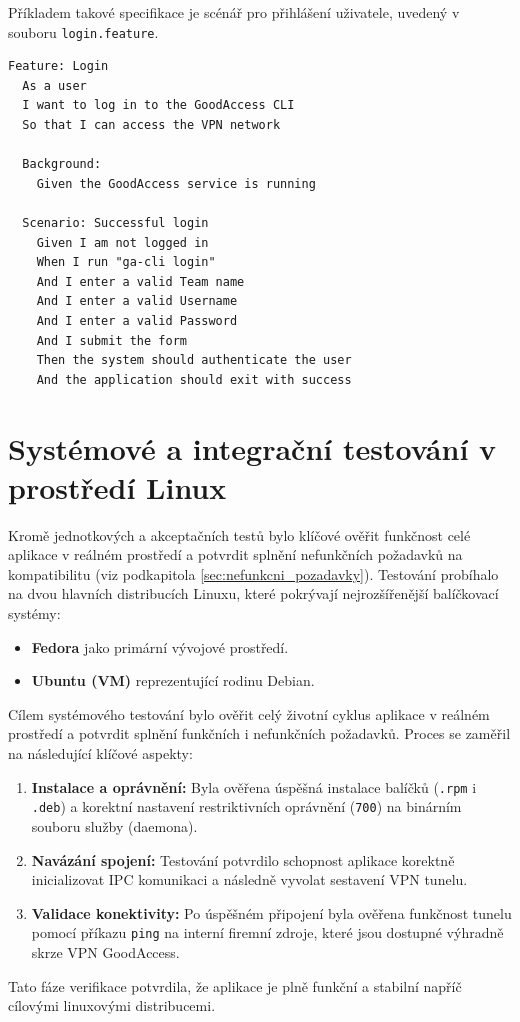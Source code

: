 Příkladem takové specifikace je scénář pro přihlášení uživatele, uvedený v souboru \texttt{login.feature}.

\begin{lstlisting}[language=Gherkin, stringstyle=\itshape, caption={Ukázka akceptačního testu pro přihlášení v jazyce Gherkin}, label={lst:login_feature}]
Feature: Login
  As a user
  I want to log in to the GoodAccess CLI
  So that I can access the VPN network

  Background:
    Given the GoodAccess service is running

  Scenario: Successful login
    Given I am not logged in
    When I run "ga-cli login"
    And I enter a valid Team name
    And I enter a valid Username
    And I enter a valid Password
    And I submit the form
    Then the system should authenticate the user
    And the application should exit with success
\end{lstlisting}

\section{Systémové a integrační testování v prostředí Linux}
\label{sec:system_integration_testing}

Kromě jednotkových a akceptačních testů bylo klíčové ověřit funkčnost celé aplikace v reálném prostředí a potvrdit splnění nefunkčních požadavků na kompatibilitu (viz podkapitola \ref{sec:nefunkcni_pozadavky}). Testování probíhalo na dvou hlavních distribucích Linuxu, které pokrývají nejrozšířenější balíčkovací systémy:
\begin{itemize}
    \item \textbf{Fedora} jako primární vývojové prostředí.
    \item \textbf{Ubuntu (VM)} reprezentující rodinu Debian.
\end{itemize}

Cílem systémového testování bylo ověřit celý životní cyklus aplikace v reálném prostředí a potvrdit splnění funkčních i nefunkčních požadavků. Proces se zaměřil na následující klíčové aspekty:
\begin{enumerate}
    \item \textbf{Instalace a oprávnění:} Byla ověřena úspěšná instalace balíčků (\texttt{.rpm} i \texttt{.deb}) a korektní nastavení restriktivních oprávnění (\texttt{700}) na binárním souboru služby (daemona).
    \item \textbf{Navázání spojení:} Testování potvrdilo schopnost aplikace korektně inicializovat IPC komunikaci a následně vyvolat sestavení VPN tunelu.
    \item \textbf{Validace konektivity:} Po úspěšném připojení byla ověřena funkčnost tunelu pomocí příkazu \texttt{ping} na interní firemní zdroje, které jsou dostupné výhradně skrze VPN GoodAccess.
\end{enumerate}

Tato fáze verifikace potvrdila, že aplikace je plně funkční a stabilní napříč cílovými linuxovými distribucemi.

